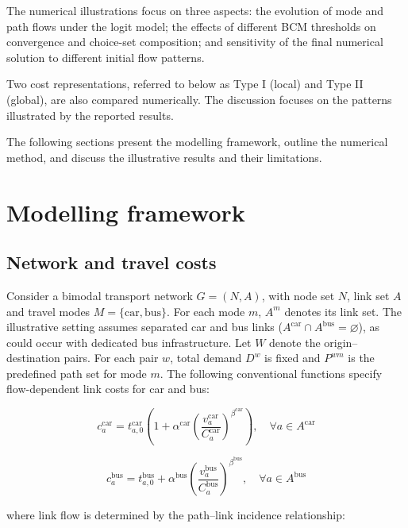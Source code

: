 \documentclass[11pt,a4paper]{article}
\begin{document}
The numerical illustrations focus on three aspects: the evolution of mode and path flows under the logit model; the effects of different BCM thresholds on convergence and choice-set composition; and sensitivity of the final numerical solution to different initial flow patterns.

Two cost representations, referred to below as Type I (local) and Type II (global), are also compared numerically. The discussion focuses on the patterns illustrated by the reported results.

The following sections present the modelling framework, outline the numerical method, and discuss the illustrative results and their limitations.


\section{Modelling framework}\label{sec:framework}


\subsection{Network and travel costs}

Consider a bimodal transport network $G=(N,A)$, with node set $N$, link set $A$ and travel modes $M=\{\mathrm{car},\mathrm{bus}\}$. For each mode $m$, $A^m$ denotes its link set. The illustrative setting assumes separated car and bus links ($A^{\mathrm{car}}\cap A^{\mathrm{bus}}=\varnothing$), as could occur with dedicated bus infrastructure. Let $W$ denote the origin--destination pairs. For each pair $w$, total demand $D^w$ is fixed and $P^{wm}$ is the predefined path set for mode $m$. The following conventional functions specify flow-dependent link costs for car and bus:

\begin{equation}
c_a^{\mathrm{car}}=t_{a,0}^{\mathrm{car}}\!\left(1+\alpha^{\mathrm{car}}\!\left(\frac{v_a^{\mathrm{car}}}{C_a^{\mathrm{car}}}\right)^{\beta^{\mathrm{car}}}\right),\quad \forall a\in A^{\mathrm{car}}
\label{eq:car-cost}
\end{equation}

\begin{equation}
c_a^{\mathrm{bus}}=t_{a,0}^{\mathrm{bus}}+\alpha^{\mathrm{bus}}\!\left(\frac{v_a^{\mathrm{bus}}}{C_a^{\mathrm{bus}}}\right)^{\beta^{\mathrm{bus}}},\quad \forall a\in A^{\mathrm{bus}}
\label{eq:bus-cost}
\end{equation}

where link flow is determined by the path--link incidence relationship:
\end{document}
